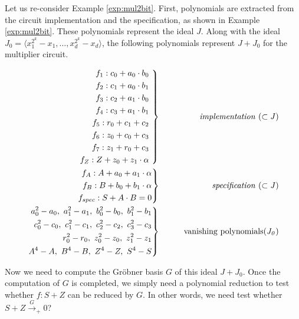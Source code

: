 \begin{Example}
Let us re-consider Example \ref{exp:mul2bit}. First, polynomials are
extracted from the circuit implementation and the specification, as
shown in Example \ref{exp:mul2bit}. These polynomials represent the
ideal $J$. Along with the ideal $J_0=\langle x_1^{2^k}-x_1, \dots,
x_d^{2^k} - x_d \rangle$, the following polynomials represent $J+J_0$
for the multiplier circuit. 

\begin{eqnarray}
 \left .  
	\begin{aligned}
		f_1:c_0+a_0 \cdot b_0  \\
		f_2:c_1+a_0 \cdot b_1  \\
		f_3:c_2+a_1 \cdot b_0  \\
		f_4:c_3+a_1 \cdot b_1  \\
		f_5:r_0+c_1 + c_2		\\
		f_6:z_0+c_0 + c_3		\\
		f_7:z_1+r_0 + c_3		\\
		f_{Z}:Z+z_0+z_1\cdot \alpha   
	\end{aligned} 
 \ \right\}
 &\qquad&  {\it implementation ~(\subset J)} \nonumber \\
 \left . 
	\begin{aligned}
		f_{A}:A+a_0+a_1\cdot \alpha   \\ 
		f_{B}:B+b_0+b_1\cdot \alpha  \\ 
		f_{spec}:S+A\cdot B =0   
	\end{aligned} 
 \right\}
 &\qquad&  {\it specification ~(\subset J)} \nonumber \\
  \left . 
	\begin{aligned}
		a_0^2-a_0, ~a_1^2-a_1,~b_0^2-b_0, ~b_1^2-b_1   \\ 
		c_0^2-c_0, ~c_1^2-c_1,~c_2^2-c_2, ~c_3^2-c_3  \\ 
		r_0^2-r_0, ~z_0^2-z_0,~z_1^2-z_1    \\ 
		A^4-A, ~B^4-B ,~Z^4-Z,~ S^4-S		  
	\end{aligned} 
 \right\}
 &\qquad&  {\it \text{vanishing polynomials} (J_0)} \nonumber
\end{eqnarray}

Now we need to compute the Gr\"obner basis $G$ of this ideal
$J+J_0$. Once the computation of $G$ is completed, we simply need a
polynomial reduction to test whether $f: S+Z$ can be reduced by
$G$. In other words, we need test whether
$S+Z\stackrel{G}{\textstyle\longrightarrow}_+ 0$? 
\end{Example}



